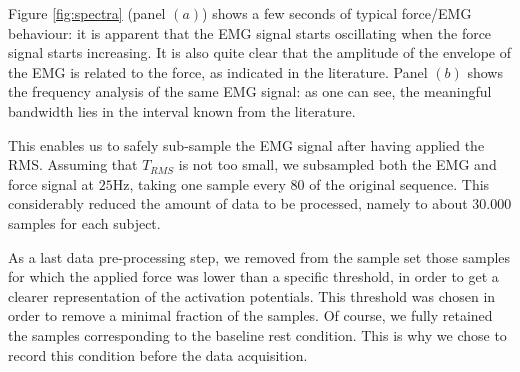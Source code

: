 Figure \ref{fig:spectra} (panel $(a)$) shows a few seconds of typical
force/EMG behaviour: it is apparent that the EMG signal starts oscillating when the force signal
starts increasing. It is also quite clear that the
amplitude of the envelope of the EMG is related to the force, as
indicated in the literature. Panel $(b)$ shows the frequency analysis
of the same EMG signal: as one can see, the meaningful bandwidth lies
in the interval known from the literature.


This enables us to safely sub-sample the EMG signal after having
applied the RMS. Assuming that $T_{RMS}$ is not too small, we
subsampled both the EMG and force signal at $25$Hz, taking one sample
every $80$ of the original sequence.  This considerably reduced the
amount of data to be processed, namely to about $30.000$ samples for
each subject.

As a last data pre-processing step, we removed from the sample set
those samples for which the applied force was lower than a specific
threshold, in order to get a clearer representation of the activation
potentials. This threshold was chosen in order to remove a minimal
fraction of the samples. Of course, we fully retained the samples
corresponding to the baseline rest condition.  This is why we chose to
record this condition before the data acquisition.
